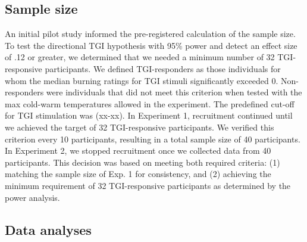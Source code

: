 \documentclass[
]{article}
\begin{document}
\hypertarget{sample-size}{%
\subsection{Sample size}\label{sample-size}}

An initial pilot study informed the pre-registered calculation of the
sample size. To test the directional TGI hypothesis with 95\% power and
detect an effect size of .12 or greater, we determined that we needed a
minimum number of 32 TGI-responsive participants. We defined
TGI-responders as those individuals for whom the median burning ratings
for TGI stimuli significantly exceeded 0. Non-responders were
individuals that did not meet this criterion when tested with the max
cold-warm temperatures allowed in the experiment. The predefined cut-off
for TGI stimulation was (xx-xx). In Experiment 1, recruitment continued
until we achieved the target of 32 TGI-responsive participants. We
verified this criterion every 10 participants, resulting in a total
sample size of 40 participants. In Experiment 2, we stopped recruitment
once we collected data from 40 participants. This decision was based on
meeting both required criteria: (1) matching the sample size of Exp. 1
for consistency, and (2) achieving the minimum requirement of 32
TGI-responsive participants as determined by the power analysis.

\hypertarget{data-analyses}{%
\subsection{Data analyses}\label{data-analyses}}
\end{document}
